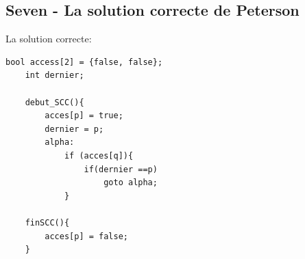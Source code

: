 \documentclass[11pt]{article}
\begin{document}
\pagebreak

\subsection{Seven - La solution correcte de Peterson}
La solution correcte:
\begin{lstlisting}[frame=single]
	bool access[2] = {false, false};
	int dernier;

	debut_SCC(){
		acces[p] = true;
		dernier = p;
		alpha:
			if (acces[q]){
				if(dernier ==p)
					goto alpha;
			}

	finSCC(){
		acces[p] = false;
	}

\end{lstlisting}
\end{document}
